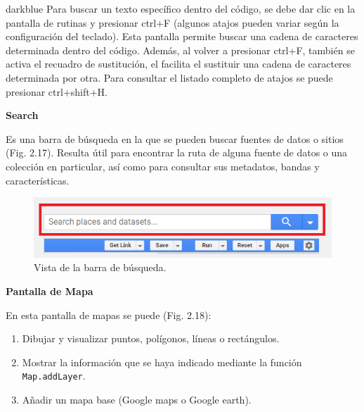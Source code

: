 \documentclass[
  12pt,
  letterpaper,
  twoside]{book}
\providecommand{\tightlist}{%
  \setlength{\itemsep}{0pt}\setlength{\parskip}{0pt}}
\begin{document}
\begin{bluebox2}

\begin{awesomeblock}{5pt}{\faLightbulb}{darkblue}
Para buscar un texto específico dentro del código, se debe dar clic en la pantalla de rutinas y presionar ctrl+F (algunos atajos pueden variar según la configuración del teclado). Esta pantalla permite buscar una cadena de caracteres determinada dentro del código. Además, al volver a presionar ctrl+F, también se activa el recuadro de sustitución, el facilita el sustituir una cadena de caracteres determinada por otra. Para consultar el listado completo de atajos se puede presionar ctrl+shift+H.

\end{awesomeblock}

\end{bluebox2}

\textbf{Search}

Es una barra de búsqueda en la que se pueden buscar fuentes de datos o sitios (Fig. 2.17). Resulta útil para encontrar la ruta de alguna fuente de datos o una colección en particular, así como para consultar sus metadatos, bandas y características.

\begin{figure}[btp]

{\centering \includegraphics[width=0.8\linewidth]{Img/search} 

}

\caption{Vista de la barra de búsqueda.}\label{fig:unnamed-chunk-18}
\end{figure}

\textbf{Pantalla de Mapa}

En esta pantalla de mapas se puede (Fig. 2.18):

\begin{enumerate}
\def\labelenumi{\arabic{enumi}.}
\tightlist
\item
  Dibujar y visualizar puntos, polígonos, líneas o rectángulos.
\item
  Mostrar la información que se haya indicado mediante la función \texttt{Map.addLayer}.
\item
  Añadir un mapa base (Google maps o Google earth).
\end{enumerate}
\end{document}
